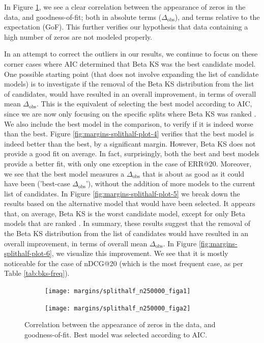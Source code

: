 In Figure \ref{fig:splithalf_n250000_figa1}, we see a clear correlation between the appearance of zeros in the data, and goodness-of-fit; both in absolute terms ($\Delta_{\text{obs}}$), and terms relative to the expectation (GoF). This further verifies our hypothesis that data containing a high number of zeros are not modeled properly.
	

In an attempt to correct the outliers in our results, we continue to focus on these corner cases where AIC determined that Beta KS was the best candidate model. One possible starting point (that does not involve expanding the list of candidate models) is to investigate if the removal of the Beta KS distribution from the list of candidates, would have resulted in an overall improvement, in terms of overall mean $\Delta_{\text{obs}}$. This is the equivalent of selecting the  best model according to AIC, since we are now only focusing on the specific splits where Beta KS was ranked . We also include the  best model in the comparison, to verify if it is indeed worse than the  best. Figure \ref{fig:margins-splithalf-plot-4} verifies that the  best model is indeed better than the  best, by a significant margin. However, Beta KS does not provide a good fit on average. In fact, surprisingly, both the  best and  best models provide a better fit, with only one exception in the case of ERR@20. Moreover, we see that the  best model measures a $\Delta_{\text{obs}}$ that is about as good as it could have been ('best-case $\Delta_{\text{obs}}$'), without the addition of more models to the current list of candidates. In Figure \ref{fig:margins-splithalf-plot-5} we break down the results based on the alternative model that would have been selected. It appears that, on average, Beta KS is the worst candidate model, except for only Beta models that are ranked . In summary, these results suggest that the removal of the Beta KS distribution from the list of candidates would have resulted in an overall improvement, in terms of overall mean $\Delta_{\text{obs}}$. In Figure \ref{fig:margins-splithalf-plot-6}, we visualize this improvement. We see that it is mostly noticeable for the case of nDCG@20 (which is the most frequent case, as per Table \ref{tab:bks-freq}).

\begin{figure}[!t]
	\centering
	\begin{subfigure}{.45\textwidth}
		\centering	
		\texttt{[image: margins/splithalf\_n250000\_figa1]}
	\end{subfigure}%
	\begin{subfigure}{.45\textwidth}
		\centering	
		\texttt{[image: margins/splithalf\_n250000\_figa2]}
	\end{subfigure}
	\caption{Correlation between the appearance of zeros in the data, and goodness-of-fit. Best model was selected according to AIC.}
	\label{fig:splithalf_n250000_figa1}
\end{figure}

